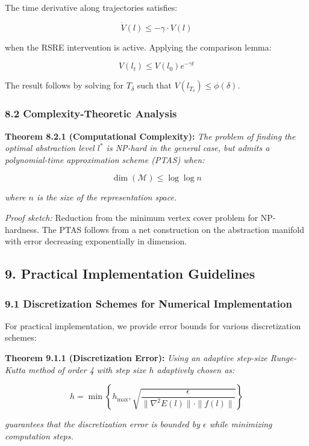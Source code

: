 \documentclass[
]{article}
\begin{document}
The time derivative along trajectories satisfies:

\[\dot{V}(l) \leq -\gamma \cdot V(l)\]

when the RSRE intervention is active. Applying the comparison lemma:

\[V(l_t) \leq V(l_0)e^{-\gamma t}\]

The result follows by solving for \(T_{\delta}\) such that
\(V(l_{T_{\delta}}) \leq \phi(\delta)\).

\subsubsection{8.2 Complexity-Theoretic
Analysis}\label{complexity-theoretic-analysis}

\textbf{Theorem 8.2.1 (Computational Complexity):} \emph{The problem of
finding the optimal abstraction level \(l^*\) is NP-hard in the general
case, but admits a polynomial-time approximation scheme (PTAS) when:}

\[\dim(\mathcal{M}) \leq \log \log n\]

\emph{where \(n\) is the size of the representation space.}

\emph{Proof sketch:} Reduction from the minimum vertex cover problem for
NP-hardness. The PTAS follows from a net construction on the abstraction
manifold with error decreasing exponentially in dimension.

\subsection{9. Practical Implementation
Guidelines}\label{practical-implementation-guidelines}

\subsubsection{9.1 Discretization Schemes for Numerical
Implementation}\label{discretization-schemes-for-numerical-implementation}

For practical implementation, we provide error bounds for various
discretization schemes:

\textbf{Theorem 9.1.1 (Discretization Error):} \emph{Using an adaptive
step-size Runge-Kutta method of order 4 with step size \(h\) adaptively
chosen as:}

\[h = \min\left\{ h_{\max}, \sqrt{\frac{\epsilon}{\|\nabla^2 E(l)\| \cdot \|f(l)\|}} \right\}\]

\emph{guarantees that the discretization error is bounded by
\(\epsilon\) while minimizing computation steps.}
\end{document}
